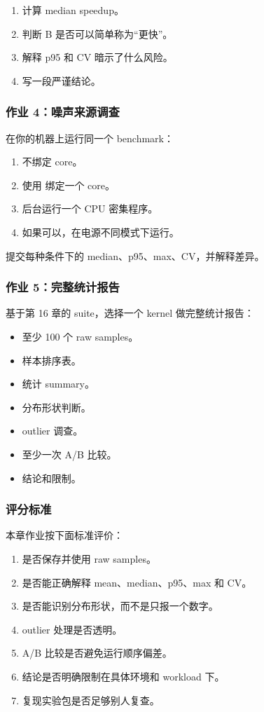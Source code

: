 \begin{exercisebox}
\begin{enumerate}
  \item 计算 median speedup。
  \item 判断 B 是否可以简单称为“更快”。
  \item 解释 p95 和 CV 暗示了什么风险。
  \item 写一段严谨结论。
\end{enumerate}

\subsubsection*{作业 4：噪声来源调查}

在你的机器上运行同一个 benchmark：

\begin{enumerate}
  \item 不绑定 core。
  \item 使用  绑定一个 core。
  \item 后台运行一个 CPU 密集程序。
  \item 如果可以，在电源不同模式下运行。
\end{enumerate}

提交每种条件下的 median、p95、max、CV，并解释差异。

\subsubsection*{作业 5：完整统计报告}

基于第 16 章的 suite，选择一个 kernel 做完整统计报告：

\begin{itemize}
  \item 至少 100 个 raw samples。
  \item 样本排序表。
  \item 统计 summary。
  \item 分布形状判断。
  \item outlier 调查。
  \item 至少一次 A/B 比较。
  \item 结论和限制。
\end{itemize}

\subsubsection*{评分标准}

本章作业按下面标准评价：

\begin{enumerate}
  \item 是否保存并使用 raw samples。
  \item 是否能正确解释 mean、median、p95、max 和 CV。
  \item 是否能识别分布形状，而不是只报一个数字。
  \item outlier 处理是否透明。
  \item A/B 比较是否避免运行顺序偏差。
  \item 结论是否明确限制在具体环境和 workload 下。
  \item 复现实验包是否足够别人复查。
\end{enumerate}
\end{exercisebox}

